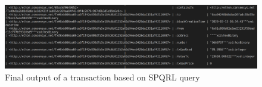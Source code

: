 \begin{center}
	
	\begin{figure}[htb!]
		
		\begin{minipage}{0.55\linewidth}
			\centering
			\includegraphics[width=1.55\textwidth]{images/chap03_output_final.png}
		\end{minipage}
		\caption{Final output of a transaction based on SPQRL query}
		
	\end{figure}
	
\end{center}
